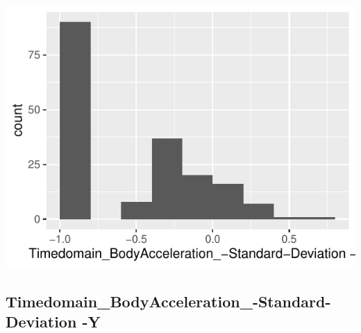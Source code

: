 \documentclass[
]{article}
\begin{document}
\begin{minipage}{0.25 \textwidth}

\includegraphics{codebook_tidydatasub_files/figure-latex/Var-6-Timedomain-BodyAcceleration--Standard-Deviation--X-1.pdf}

\end{minipage}

\noindent\makebox[\linewidth]{\rule{\textwidth}{0.4pt}}

\hypertarget{timedomain_bodyacceleration_-standard-deviation--y}{%
\subsection{Timedomain\_BodyAcceleration\_-Standard-Deviation
-Y}\label{timedomain_bodyacceleration_-standard-deviation--y}}
\end{document}
